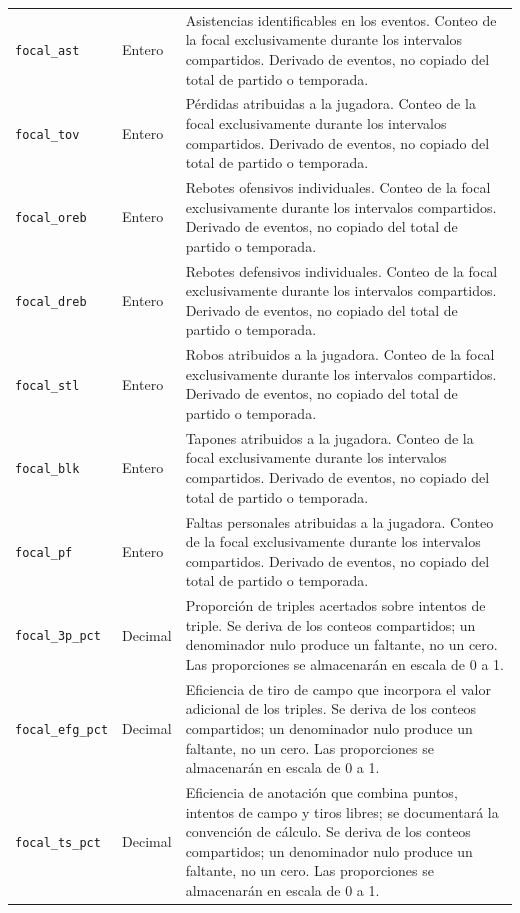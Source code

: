 \begin{longtable}{@{}>{\raggedright\arraybackslash}p{5.0cm}>{\raggedright\arraybackslash}p{1.9cm}>{\raggedright\arraybackslash}p{7.7cm}@{}}
\texttt{focal\_\allowbreak ast} & Entero & Asistencias identificables en los eventos. Conteo de la focal exclusivamente durante los intervalos compartidos. Derivado de eventos, no copiado del total de partido o temporada.\\
\texttt{focal\_\allowbreak tov} & Entero & Pérdidas atribuidas a la jugadora. Conteo de la focal exclusivamente durante los intervalos compartidos. Derivado de eventos, no copiado del total de partido o temporada.\\
\texttt{focal\_\allowbreak oreb} & Entero & Rebotes ofensivos individuales. Conteo de la focal exclusivamente durante los intervalos compartidos. Derivado de eventos, no copiado del total de partido o temporada.\\
\texttt{focal\_\allowbreak dreb} & Entero & Rebotes defensivos individuales. Conteo de la focal exclusivamente durante los intervalos compartidos. Derivado de eventos, no copiado del total de partido o temporada.\\
\texttt{focal\_\allowbreak stl} & Entero & Robos atribuidos a la jugadora. Conteo de la focal exclusivamente durante los intervalos compartidos. Derivado de eventos, no copiado del total de partido o temporada.\\
\texttt{focal\_\allowbreak blk} & Entero & Tapones atribuidos a la jugadora. Conteo de la focal exclusivamente durante los intervalos compartidos. Derivado de eventos, no copiado del total de partido o temporada.\\
\texttt{focal\_\allowbreak pf} & Entero & Faltas personales atribuidas a la jugadora. Conteo de la focal exclusivamente durante los intervalos compartidos. Derivado de eventos, no copiado del total de partido o temporada.\\
\texttt{focal\_\allowbreak 3p\_\allowbreak pct} & Decimal & Proporción de triples acertados sobre intentos de triple. Se deriva de los conteos compartidos; un denominador nulo produce un faltante, no un cero. Las proporciones se almacenarán en escala de 0 a 1.\\
\texttt{focal\_\allowbreak efg\_\allowbreak pct} & Decimal & Eficiencia de tiro de campo que incorpora el valor adicional de los triples. Se deriva de los conteos compartidos; un denominador nulo produce un faltante, no un cero. Las proporciones se almacenarán en escala de 0 a 1.\\
\texttt{focal\_\allowbreak ts\_\allowbreak pct} & Decimal & Eficiencia de anotación que combina puntos, intentos de campo y tiros libres; se documentará la convención de cálculo. Se deriva de los conteos compartidos; un denominador nulo produce un faltante, no un cero. Las proporciones se almacenarán en escala de 0 a 1.\\

\end{longtable}
